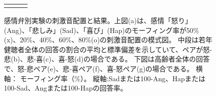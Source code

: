 \begin{figure}[h]
\begin{tabular}{ccc}
  \begin{minipage} {0.31\hsize}
  \centering
  \includegraphics [ width = 1\columnwidth]{Figure/ExpAngHapSad/Fig1f_Eld_Raw_AllSbj_hap-sad.eps }
  \label{fig:Eld _ExpEmoWHIS_hap-sad }
  \end{minipage} &
  
  \begin{minipage} {0.31\hsize}
  \centering
  \includegraphics [ width = 1\columnwidth]{Figure/ExpAngHapSad/Fig1g_Eld_Raw_AllSbj_ang-hap.eps }
  \label{fig:Eld_ExpEmoWHIS_ang-hap }
  \end{minipage}
  
  \end{tabular}
  
  \vspace {-6pt}
  \caption{感情弁別実験の刺激音配置と結果。上図(a)は、感情「怒り」(Ang)、「悲しみ」(Sad)、「喜び」(Hap)のモーフィング率が50\%(x)、20\%、40\%、60\%、80\%(o)の刺激音配置の模式図。
            中段は若年健聴者全体の回答の割合の平均と標準偏差を示していて、ペアが怒-悲(b)、悲-喜(c)、喜-怒(d)の場合である。
            下図は高齢者全体の回答で、怒-悲ペア(e)、悲-喜ペア(f)、喜-怒ペア(g)の場合である。
            横軸： モーフィング率（\%）。 縦軸:Sadまたは100-Ang、Hapまたは100-Sad、Angまたは100-Hapの回答率。}
  
  \label{fig:ExpRsltEmoPercent}

  \vspace {-12pt}
  \end{figure}


